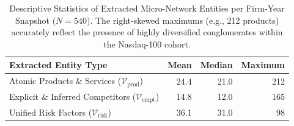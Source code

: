 \begin{table}[htbp]
\centering
\caption{Descriptive Statistics of Extracted Micro-Network Entities per Firm-Year Snapshot ($N=540$). The right-skewed maximums (e.g., 212 products) accurately reflect the presence of highly diversified conglomerates within the Nasdaq-100 cohort.}
\label{tab:descriptive_stats}
\small
\begin{tabular}{@{}lrrr@{}}
\toprule
\textbf{Extracted Entity Type} & \textbf{Mean} & \textbf{Median} & \textbf{Maximum} \\
\midrule
Atomic Products \& Services ($\mathcal{V}_{\text{prod}}$) & 24.4 & 21.0 & 212 \\
Explicit \& Inferred Competitors ($\mathcal{V}_{\text{cmpt}}$) & 14.8 & 12.0 & 165 \\
Unified Risk Factors ($\mathcal{V}_{\text{risk}}$) & 36.1 & 31.0 & 98 \\
\bottomrule
\end{tabular}
\end{table}